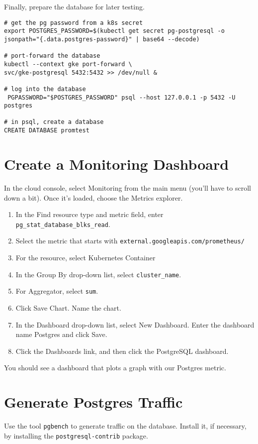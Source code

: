\documentclass{article}
\begin{document}
Finally, prepare the database for later testing.

\begin{verbatim}
# get the pg password from a k8s secret
export POSTGRES_PASSWORD=$(kubectl get secret pg-postgresql -o 
jsonpath="{.data.postgres-password}" | base64 --decode)

# port-forward the database
kubectl --context gke port-forward \
svc/gke-postgresql 5432:5432 >> /dev/null &

# log into the database
 PGPASSWORD="$POSTGRES_PASSWORD" psql --host 127.0.0.1 -p 5432 -U postgres 

# in psql, create a database
CREATE DATABASE promtest
\end{verbatim}

\section{Create a Monitoring Dashboard}
In the cloud console, select Monitoring from the main menu (you'll have to scroll down a bit). Once it's loaded, choose the Metrics explorer.

\begin{enumerate}
  \item In the Find resource type and metric field, enter
  \texttt{pg\_stat\_database\_blks\_read}.
  \item Select the metric that starts with 
  \texttt{external.googleapis.com/prometheus/}
  \item For the resource, select Kubernetes Container
  \item In the Group By drop-down list, select \texttt{cluster\_name}.
  \item For Aggregator, select \texttt{sum}.
  \item Click Save Chart. Name the chart.
  \item In the Dashboard drop-down list, select New Dashboard.
  Enter the dashboard name Postgres and click Save.
  \item Click the Dashboards link, and then click the PostgreSQL dashboard.
\end{enumerate}

You should see a dashboard that plots a graph with our Postgres metric.

\section{Generate Postgres Traffic}
Use the tool \texttt{pgbench} to generate traffic on the database. Install it, if necessary, by installing the \texttt{postgresql-contrib} package.
\end{document}

